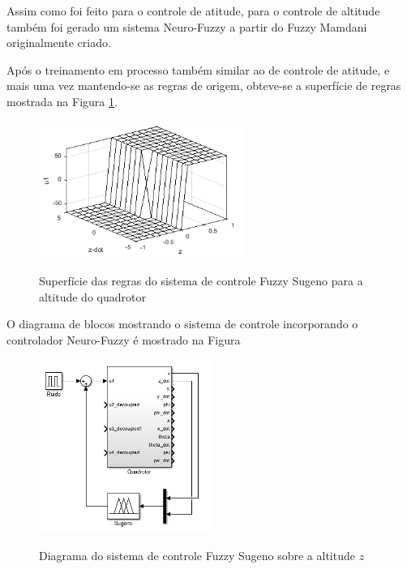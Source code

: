 Assim como foi feito para o controle de atitude, para o controle de altitude também foi gerado um sistema Neuro-Fuzzy a partir do Fuzzy Mamdani originalmente criado.

Após o treinamento em processo também similar ao de controle de atitude, e mais uma vez mantendo-se as regras de origem, obteve-se a superfície de regras mostrada na Figura \ref{fig:u1_sugeno_surface}.

\begin{figure}[!htb]
    \centering
    \caption{Superfície das regras do sistema de controle Fuzzy Sugeno para a altitude do quadrotor}
    \includegraphics[width=0.6\textwidth]{./04-figuras/resultados/fis_u1/u1_sugeno_surface}
    \label{fig:u1_sugeno_surface}
\end{figure}

O diagrama de blocos mostrando o sistema de controle incorporando o controlador Neuro-Fuzzy é mostrado na Figura 

\begin{figure}[!htb]
    \centering
    \caption{Diagrama do sistema de controle Fuzzy Sugeno sobre a altitude $z$}
    \includegraphics[width=0.5\textwidth]{./04-figuras/resultados/fis_u1/u1_sugeno_blocks}
    \label{fig:u1_sugeno_blocks}
\end{figure}


